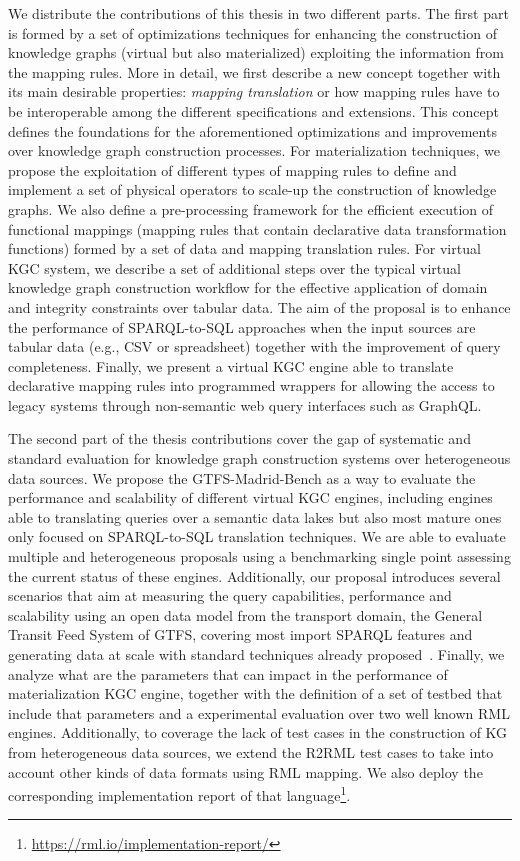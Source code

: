 We distribute the contributions of this thesis in two different parts. The first part is formed by a set of optimizations techniques for enhancing the construction of knowledge graphs (virtual but also materialized) exploiting the information from the mapping rules. More in detail, we first describe a new concept together with its main desirable properties: \textit{mapping translation} or how mapping rules have to be interoperable among the different specifications and extensions. This concept defines the foundations for the aforementioned optimizations and improvements over knowledge graph construction processes. For materialization techniques, we propose the exploitation of different types of mapping rules to define and implement a set of physical operators to scale-up the construction of knowledge graphs. We also define a pre-processing framework for the efficient execution of functional mappings (mapping rules that contain declarative data transformation functions) formed by a set of data and mapping translation rules. For virtual KGC system, we describe a set of additional steps over the typical virtual knowledge graph construction workflow for the effective application of domain and integrity constraints over tabular data. The aim of the proposal is to enhance the performance of SPARQL-to-SQL approaches when the input sources are tabular data (e.g., CSV or spreadsheet) together with the improvement of query completeness. Finally, we present a virtual KGC engine able to translate declarative mapping rules into programmed wrappers for allowing the access to legacy systems through non-semantic web query interfaces such as GraphQL.

The second part of the thesis contributions cover the gap of systematic and standard evaluation for knowledge graph construction systems over heterogeneous data sources. We propose the GTFS-Madrid-Bench as a way to evaluate the performance and scalability of different virtual KGC engines, including engines able to translating queries over a semantic data lakes but also most mature ones only focused on SPARQL-to-SQL translation techniques. We are able to evaluate multiple and heterogeneous proposals using a benchmarking single point assessing the current status of these engines. Additionally, our proposal introduces several scenarios that aim at measuring the query capabilities, performance and scalability using an open data model from the transport domain, the General Transit Feed System of GTFS, covering most import SPARQL features and generating data at scale with standard techniques already proposed~\citep{lantivig}. Finally, we analyze what are the parameters that can impact in the performance of materialization KGC engine, together with the definition of a set of testbed that include that parameters and a experimental evaluation over two well known RML engines. Additionally, to coverage the lack of test cases in the construction of KG from heterogeneous data sources, we extend the R2RML test cases to take into account other kinds of data formats using RML mapping. We also deploy the corresponding implementation report of that language\footnote{\url{https://rml.io/implementation-report/}}.




